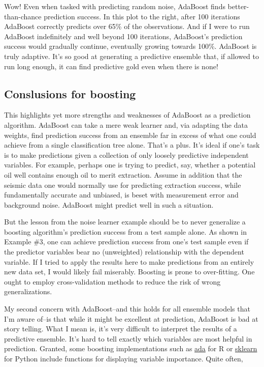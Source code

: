 \documentclass[]{tufte-handout}
\begin{document}
Wow! Even when tasked with predicting random noise, AdaBoost finds
better-than-chance prediction success. In this plot to the right, after
100 iterations AdaBoost correctly predicts over 65\% of the
observations. And if I were to run AdaBoost indefinitely and well beyond
100 iterations, AdaBoost's prediction success would gradually continue,
eventually growing towards 100\%. AdaBoost is truly adaptive. It's so
good at generating a predictive ensemble that, if allowed to run long
enough, it can find predictive gold even when there is none!

\subsection{Conslusions for boosting}\label{conslusions-for-boosting}

This highlights yet more strengths and weaknesses of AdaBoost as a
prediction algorithm. AdaBoost can take a mere weak learner and, via
adapting the data weights, find prediction success from an ensemble far
in excess of what one could achieve from a single classification tree
alone. That's a plus. It's ideal if one's task is to make predictions
given a collection of only loosely predictive independent variables. For
example, perhaps one is trying to predict, say, whether a potential oil
well contains enough oil to merit extraction. Assume in addition that
the seismic data one would normally use for predicting extraction
success, while fundamentally accurate and unbiased, is beset with
measurement error and background noise. AdaBoost might predict well in
such a situation.

But the lesson from the noise learner example should be to never
generalize a boosting algorithm's prediction success from a test sample
alone. As shown in Example \#3, one can achieve prediction success from
one's test sample even if the predictor variables bear no (unweighted)
relationship with the dependent variable. If I tried to apply the
results here to make predictions from an entirely new data set, I would
likely fail miserably. Boosting is prone to over-fitting. One ought to
employ cross-validation methods to reduce the risk of wrong
generalizations.

My second concern with AdaBoost--and this holds for all ensemble models
that I'm aware of--is that while it might be excellent at prediction,
AdaBoost is bad at story telling. What I mean is, it's very difficult to
interpret the results of a predictive ensemble. It's hard to tell
exactly which variables are most helpful in prediction. Granted, some
boosting implementations such as
\href{https://cran.r-project.org/web/packages/ada/ada.pdf}{ada} for R or
\href{https://github.com/scikit-learn/scikit-learn}{sklearn} for Python
include functions for displaying variable importance. Quite often,
\end{document}

